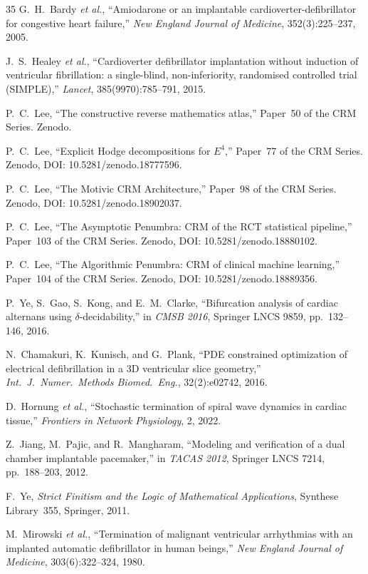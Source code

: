 \documentclass[11pt,a4paper]{article}
\theoremstyle{plain}
\theoremstyle{definition}
\begin{document}
\begin{thebibliography}{35}
G.~H.~Bardy \textit{et al.},
``Amiodarone or an implantable cardioverter-defibrillator for congestive heart failure,''
\textit{New England Journal of Medicine}, 352(3):225--237, 2005.

J.~S.~Healey \textit{et al.},
``Cardioverter defibrillator implantation without induction of ventricular fibrillation: a single-blind, non-inferiority, randomised controlled trial (SIMPLE),''
\textit{Lancet}, 385(9970):785--791, 2015.

P.~C.~Lee,
``The constructive reverse mathematics atlas,''
Paper~50 of the CRM Series.
Zenodo.

P.~C.~Lee,
``Explicit Hodge decompositions for $E^4$,''
Paper~77 of the CRM Series.
Zenodo, DOI: 10.5281/zenodo.18777596.

P.~C.~Lee,
``The Motivic CRM Architecture,''
Paper~98 of the CRM Series.
Zenodo, DOI: 10.5281/zenodo.18902037.

P.~C.~Lee,
``The Asymptotic Penumbra: CRM of the RCT statistical pipeline,''
Paper~103 of the CRM Series.
Zenodo, DOI: 10.5281/zenodo.18880102.

P.~C.~Lee,
``The Algorithmic Penumbra: CRM of clinical machine learning,''
Paper~104 of the CRM Series.
Zenodo, DOI: 10.5281/zenodo.18889356.

P.~Ye, S.~Gao, S.~Kong, and E.~M.~Clarke,
``Bifurcation analysis of cardiac alternans using $\delta$-decidability,''
in \textit{CMSB 2016}, Springer LNCS 9859, pp.~132--146, 2016.

N.~Chamakuri, K.~Kunisch, and G.~Plank,
``PDE constrained optimization of electrical defibrillation in a 3D ventricular slice geometry,''
\textit{Int.\ J.\ Numer.\ Methods Biomed.\ Eng.}, 32(2):e02742, 2016.

D.~Hornung \textit{et al.},
``Stochastic termination of spiral wave dynamics in cardiac tissue,''
\textit{Frontiers in Network Physiology}, 2, 2022.


Z.~Jiang, M.~Pajic, and R.~Mangharam,
``Modeling and verification of a dual chamber implantable pacemaker,''
in \textit{TACAS 2012}, Springer LNCS 7214, pp.~188--203, 2012.

F.~Ye,
\textit{Strict Finitism and the Logic of Mathematical Applications},
Synthese Library~355, Springer, 2011.

M.~Mirowski \textit{et al.},
``Termination of malignant ventricular arrhythmias with an implanted automatic defibrillator in human beings,''
\textit{New England Journal of Medicine}, 303(6):322--324, 1980.


\end{thebibliography}
\end{document}
